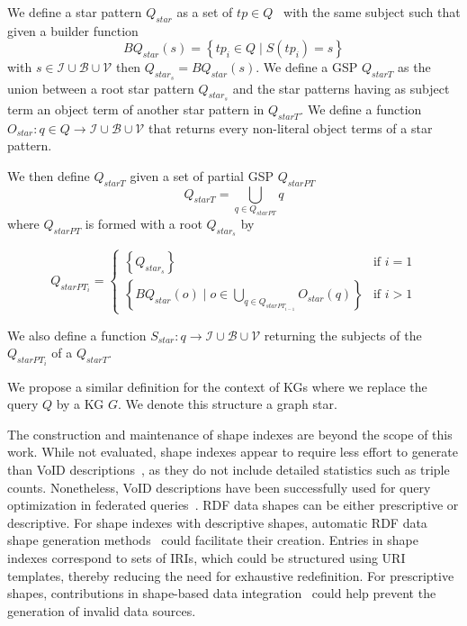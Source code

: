 \begin{definition}\label{def:starPattern}
   We define a star pattern $Q_{star}$ as a set of $tp \in Q$~\cite{Karim2020} with the same subject such that 
   given a builder function 
   \begin{equation}
       BQ_{star}(s) = \left\{ tp_i \in Q \mid S(tp_i) = s \right\}
   \end{equation}
   with $s \in \mathcal{I} \cup \mathcal{B} \cup \mathcal{V}$ then $Q_{star_s} = BQ_{star}(s)$.
   We define a GSP $Q_{starT}$ as the union between a root star pattern $Q_{star_s}$
   and the star patterns having as subject term an object term of another star pattern in $Q_{starT}$.
   We define a function 
   $O_{star}: q \in Q \rightarrow  \mathcal{I} \cup \mathcal{B} \cup \mathcal{V}$
   that returns every non-literal object terms of a star pattern.

   We then define $Q_{starT}$ given a  set of partial GSP $Q_{starPT}$
   \begin{equation}
      Q_{starT} = \bigcup_{q \in Q_{starPT}} q
   \end{equation}
   where $Q_{starPT}$ is formed with a root $Q_{star_s}$ by

   \begin{equation}
           Q_{starPT_i} =
       \begin{cases}
         \left\{ Q_{star_s} \right\} & \text{if } i = 1 \\
           \left\{ BQ_{star}(o) \mid o \in \bigcup_{q \in Q_{starPT_{i-1}}} O_{star}(q) \right\} & \text{if } i>1
       \end{cases}
   \end{equation}

   We also define a function  
   $S_{star}: q \rightarrow  \mathcal{I} \cup \mathcal{B} \cup \mathcal{V}$
   returning the subjects of the $Q_{starPT_i}$ of a $Q_{starT}$.

   We propose a similar definition for the context of KGs where we replace the query $Q$ by a KG $G$. 
   We denote this structure a graph star.
   
\end{definition}

The construction and maintenance of shape indexes are beyond the scope of this work.
While not evaluated, shape indexes appear to require less effort to generate than VoID descriptions~\cite{Boehm2011}, as they do not include detailed statistics such as triple counts.
Nonetheless, VoID descriptions have been successfully used for query optimization in federated queries~\cite{Montoya2017}.
RDF data shapes can be either prescriptive or descriptive.
For shape indexes with descriptive shapes, automatic RDF data shape generation methods~\cite{fernandez2023extracting} could facilitate their creation.
Entries in shape indexes correspond to sets of IRIs, which could be structured using URI templates, thereby reducing the need for exhaustive redefinition.
For prescriptive shapes, contributions in shape-based data integration~\cite{LabraGayo2023} could help prevent the generation of invalid data sources.


